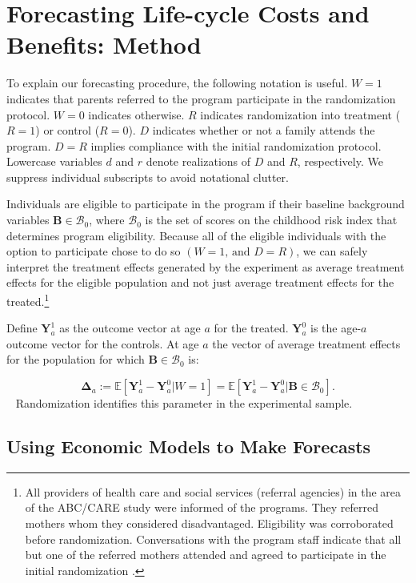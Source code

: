 \section{Forecasting Life-cycle Costs and Benefits: Method} \label{section:cbamethodology}

\noindent To explain our forecasting procedure, the following notation is useful. $W=1$ indicates that parents referred to the program participate in the randomization protocol. $W=0$ indicates otherwise. $R$ indicates randomization into treatment ($R = 1$) or control ($R = 0$). $D$ indicates whether or not a family attends the program. $D= R$ implies compliance with the initial randomization protocol. Lowercase variables $d$ and $r$ denote realizations of $D$ and $R$, respectively. We suppress individual subscripts to avoid notational clutter.

Individuals are eligible to participate in the program if their baseline background variables $\bm{B}\in\mathcal{B}_0$, where $\mathcal{B}_0$ is the set of scores on the childhood risk index that determines program eligibility. Because all of the eligible individuals with the option to participate chose to do so $(W=1\text{, and } D=R)$, we can safely interpret the treatment effects generated by the experiment as average treatment effects for the eligible population and not just average treatment effects for the treated.\footnote{All providers of health care and social services (referral agencies) in the area of the ABC/CARE study were informed of the programs. They referred mothers whom they considered disadvantaged. Eligibility was corroborated before randomization. Conversations with the program staff indicate that all but one of the referred mothers attended and agreed to participate in the initial randomization \citep{Ramey-etal_2012-ABC}.}

Define $\bm{Y}^1_a$ as the outcome vector at age $a$ for the treated. $\bm{Y}^0_a$ is the age-$a$ outcome vector for the controls. At age $a$ the vector of average treatment effects for the population for which $\bm{B}\in\mathcal{B}_0$ is:

\begin{equation}
\bm{\Delta}_a  := \mathbb{E} \left[ \bm{Y}^1_a - \bm{Y}^0_a | W = 1 \right] = \mathbb{E} \left[\bm{Y}^1_a - \bm{Y}^0_{a} | \bm{B} \in \mathcal{B}_0 \right]. \label{eq:mainte}
\end{equation}\
%
Randomization identifies this parameter in the experimental sample.

\subsection{Using Economic Models to Make Forecasts}

